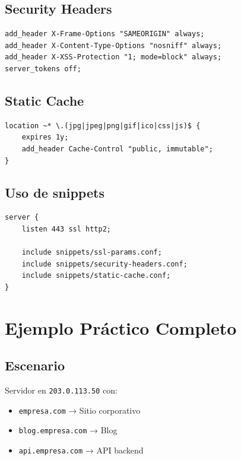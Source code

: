 \documentclass[11pt,a4paper]{article}
\begin{document}
\subsection{Security Headers}

\begin{lstlisting}[caption=/etc/nginx/snippets/security-headers.conf]
add_header X-Frame-Options "SAMEORIGIN" always;
add_header X-Content-Type-Options "nosniff" always;
add_header X-XSS-Protection "1; mode=block" always;
server_tokens off;
\end{lstlisting}

\subsection{Static Cache}

\begin{lstlisting}[caption=/etc/nginx/snippets/static-cache.conf]
location ~* \.(jpg|jpeg|png|gif|ico|css|js)$ {
    expires 1y;
    add_header Cache-Control "public, immutable";
}
\end{lstlisting}

\subsection{Uso de snippets}

\begin{lstlisting}
server {
    listen 443 ssl http2;
    
    include snippets/ssl-params.conf;
    include snippets/security-headers.conf;
    include snippets/static-cache.conf;
}
\end{lstlisting}

\section{Ejemplo Práctico Completo}

\subsection{Escenario}

Servidor en \texttt{203.0.113.50} con:
\begin{itemize}
    \item \texttt{empresa.com} → Sitio corporativo
    \item \texttt{blog.empresa.com} → Blog
    \item \texttt{api.empresa.com} → API backend
\end{itemize}
\end{document}
